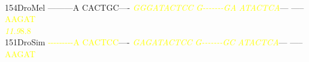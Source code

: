 \documentclass[11pt,twoside,reqno,a4paper]{article}
\begin{document}
{\\
154\hspace*{1\charwidth}DroMel	---------A	CACTGC----	\textit{\textcolor{yellow}{G}}\textit{\textcolor{yellow}{G}}\textit{\textcolor{yellow}{G}}\textit{\textcolor{yellow}{A}}\textit{\textcolor{yellow}{T}}\textit{\textcolor{yellow}{A}}\textit{\textcolor{yellow}{C}}\textit{\textcolor{yellow}{T}}\textit{\textcolor{yellow}{C}}\textit{\textcolor{yellow}{C}}	\textit{\textcolor{yellow}{G}}\textit{\textcolor{yellow}{-}}\textit{\textcolor{yellow}{-}}\textit{\textcolor{yellow}{-}}\textit{\textcolor{yellow}{-}}\textit{\textcolor{yellow}{-}}\textit{\textcolor{yellow}{-}}\textit{\textcolor{yellow}{-}}\textit{\textcolor{yellow}{G}}\textit{\textcolor{yellow}{A}}	\textit{\textcolor{yellow}{A}}\textit{\textcolor{yellow}{T}}\textit{\textcolor{yellow}{A}}\textit{\textcolor{yellow}{C}}\textit{\textcolor{yellow}{T}}\textit{\textcolor{yellow}{C}}\textit{\textcolor{yellow}{A}}---	-----\textcolor{yellow}{A}\textcolor{yellow}{A}\textcolor{yellow}{G}\textcolor{yellow}{A}\textcolor{yellow}{T}	\\
\hspace*{4\charwidth}\hspace*{7\charwidth}\hspace*{1\charwidth}\hspace*{1\charwidth}\hspace*{20\charwidth}\textit{\textcolor{yellow}{11.9}}\hspace*{1\charwidth}\hspace*{1\charwidth}\hspace*{1\charwidth}\hspace*{31\charwidth}\textcolor{yellow}{8.8}\hspace*{1\charwidth}\\
151\hspace*{1\charwidth}DroSim	\textcolor{yellow}{-}\textcolor{yellow}{-}\textcolor{yellow}{-}\textcolor{yellow}{-}\textcolor{yellow}{-}\textcolor{yellow}{-}\textcolor{yellow}{-}\textcolor{yellow}{-}\textcolor{yellow}{-}\textcolor{yellow}{A}	\textcolor{yellow}{C}\textcolor{yellow}{A}\textcolor{yellow}{C}\textcolor{yellow}{T}\textcolor{yellow}{C}\textcolor{yellow}{C}----	\textit{\textcolor{yellow}{G}}\textit{\textcolor{yellow}{A}}\textit{\textcolor{yellow}{G}}\textit{\textcolor{yellow}{A}}\textit{\textcolor{yellow}{T}}\textit{\textcolor{yellow}{A}}\textit{\textcolor{yellow}{C}}\textit{\textcolor{yellow}{T}}\textit{\textcolor{yellow}{C}}\textit{\textcolor{yellow}{C}}	\textit{\textcolor{yellow}{G}}\textit{\textcolor{yellow}{-}}\textit{\textcolor{yellow}{-}}\textit{\textcolor{yellow}{-}}\textit{\textcolor{yellow}{-}}\textit{\textcolor{yellow}{-}}\textit{\textcolor{yellow}{-}}\textit{\textcolor{yellow}{-}}\textit{\textcolor{yellow}{G}}\textit{\textcolor{yellow}{C}}	\textit{\textcolor{yellow}{A}}\textit{\textcolor{yellow}{T}}\textit{\textcolor{yellow}{A}}\textit{\textcolor{yellow}{C}}\textit{\textcolor{yellow}{T}}\textit{\textcolor{yellow}{C}}\textit{\textcolor{yellow}{A}}---	-----\textcolor{yellow}{A}\textcolor{yellow}{A}\textcolor{yellow}{G}\textcolor{yellow}{A}\textcolor{yellow}{T}	\\
}
\end{document}

